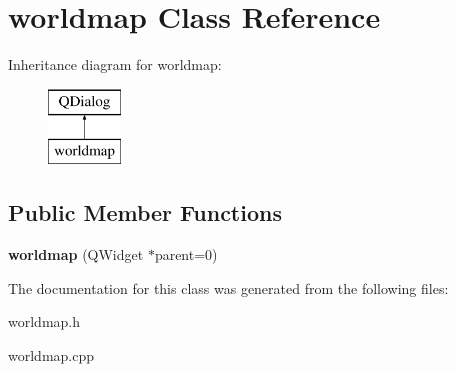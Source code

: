 \hypertarget{classworldmap}{\section{worldmap Class Reference}
\label{classworldmap}
}
Inheritance diagram for worldmap\-:\begin{figure}[H]
\begin{center}
\leavevmode
\includegraphics[height=2.000000cm]{classworldmap}
\end{center}
\end{figure}
\subsection*{Public Member Functions}
\begin{DoxyCompactItemize}
\item 
\hypertarget{classworldmap_a970f51f58c07cc43b110fecf43519838}{{\bfseries worldmap} (Q\-Widget $\ast$parent=0)}\label{classworldmap_a970f51f58c07cc43b110fecf43519838}

\end{DoxyCompactItemize}


The documentation for this class was generated from the following files\-:\begin{DoxyCompactItemize}
\item 
worldmap.\-h\item 
worldmap.\-cpp\end{DoxyCompactItemize}
